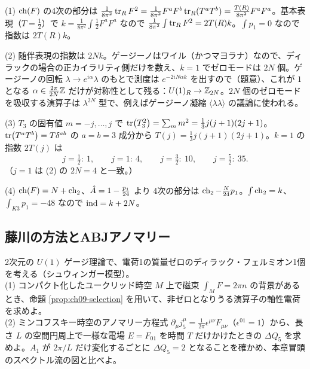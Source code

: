 \begin{solution}
(1) $\operatorname{ch}(F)$ の4次の部分は $\frac{1}{8\pi^2}\tr_RF^2=\frac{1}{8\pi^2}F^aF^b\tr_R(T^aT^b)=\frac{T(R)}{8\pi^2}F^aF^a$。基本表現（$T=\frac12$）で $k=\frac1{8\pi^2}\int\frac12F^aF^a$ なので $\frac1{8\pi^2}\int\tr_RF^2=2T(R)k$。$\int p_1=0$ なので指数は $2T(R)k$。

(2) 随伴表現の指数は $2Nk$。ゲージーノはワイル（かつマヨラナ）なので、ディラックの場合の正カイラリティ側だけを数え、$k=1$ でゼロモードは $2N$ 個。ゲージーノの回転 $\lambda\to e^{i\alpha}\lambda$ のもとで測度は $e^{-2iN\alpha k}$ を出すので（題意）、これが $1$ となる $\alpha\in\frac{2\pi}{2N}\mathbb{Z}$ だけが対称性として残る：$U(1)_R\to\mathbb{Z}_{2N}$。$2N$ 個のゼロモードを吸収する演算子は $\lambda^{2N}$ 型で、例えばゲージーノ凝縮 $\langle\lambda\lambda\rangle$ の議論に使われる。

(3) $T_3$ の固有値 $m=-j,\dots,j$ で $\tr(T_3^2)=\sum_mm^2=\frac13j(j+1)(2j+1)$。$\tr(T^aT^b)=T\delta^{ab}$ の $a=b=3$ 成分から $T(j)=\frac13j(j+1)(2j+1)$。$k=1$ の指数 $2T(j)$ は
\[
j=\tfrac12:\ 1,\qquad j=1:\ 4,\qquad j=\tfrac32:\ 10,\qquad j=\tfrac52:\ 35 .
\]
（$j=1$ は (2) の $2N=4$ と一致。）

(4) $\operatorname{ch}(F)=N+\operatorname{ch}_2$、$\hat{A}=1-\frac{p_1}{24}$ より 4次の部分は $\operatorname{ch}_2-\frac{N}{24}p_1$。$\int\operatorname{ch}_2=k$、$\int_{K3}p_1=-48$ なので $\operatorname{ind}=k+2N$。
\end{solution}

\subsection{藤川の方法とABJアノマリー}

\begin{problem}[難易度 A]\label{ch09-prob-schwinger}
2次元の $U(1)$ ゲージ理論で、電荷1の質量ゼロのディラック・フェルミオン1個を考える（シュウィンガー模型）。\\
(1) コンパクト化したユークリッド時空 $M$ 上で磁束 $\int_MF=2\pi n$ の背景があるとき、命題 \ref{prop:ch09-selection} を用いて、非ゼロとなりうる演算子の軸性電荷を求めよ。\\
(2) ミンコフスキー時空のアノマリー方程式 $\partial_\mu j_5^\mu=\frac{1}{2\pi}\epsilon^{\mu\nu}F_{\mu\nu}$（$\epsilon^{01}=1$）から、長さ $L$ の空間円周上で一様な電場 $E=F_{01}$ を時間 $T$ だけかけたときの $\Delta Q_5$ を求めよ。$A_1$ が $2\pi/L$ だけ変化するごとに $\Delta Q_5=2$ となることを確かめ、本章冒頭のスペクトル流の図と比べよ。
\end{problem}

